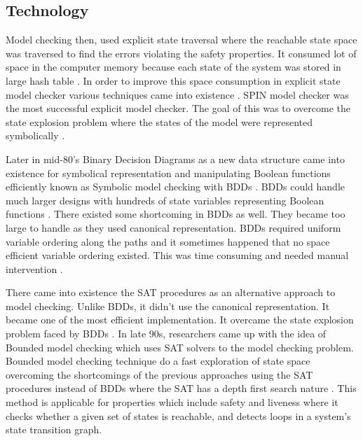 \documentclass[a4paper,12pt]{report}
\begin{document}
\begin{onehalfspacing}
\section{Technology}
\label{tech}

Model checking then, used explicit state traversal where the reachable state space was traversed to find the errors violating the safety properties. It consumed lot of space in the computer memory because each state of the system was stored in large hash table \cite{KenmcmiI.Mironov2006}. In order to improve this space consumption in explicit state model checker various techniques came into existence \cite{McMillan1992}. SPIN model checker was the most successful explicit model checker. The goal of this was to overcome the state explosion problem where the states of the model were represented symbolically \cite{McMillan1992}.

Later in mid-80's Binary Decision Diagrams as a new data structure came into existence for symbolical representation and manipulating Boolean functions efficiently known as Symbolic model checking with BDDs \cite{B.Berard2001}. BDDs could handle much larger designs with hundreds of state variables representing Boolean functions \cite{ErichGamma1995}. There existed some shortcoming in BDDs as well. They became too large to handle as they used canonical representation. BDDs required uniform variable ordering along the paths and it sometimes happened that no space efficient variable ordering existed. This was time consuming and needed manual intervention \cite{McMillan1992}.

There came into existence the SAT procedures as an alternative approach to model checking. Unlike BDDs, it didn’t use the canonical representation. It became one of the most efficient implementation. It overcame the state explosion problem faced by BDDs \cite{McMillan1992}. 
In late 90s, researchers came up with the idea of Bounded model checking which uses SAT solvers to the model checking problem. Bounded model checking technique do a fast exploration of state space overcoming the shortcomings of the previous approaches using the SAT procedures instead of BDDs where the SAT has a depth first search nature \cite{McMillan1992}. This method is applicable for properties which include safety and liveness where it checks whether a given set of states is reachable, and detects loops in a system’s state transition graph.


\end{onehalfspacing}
\end{document}
